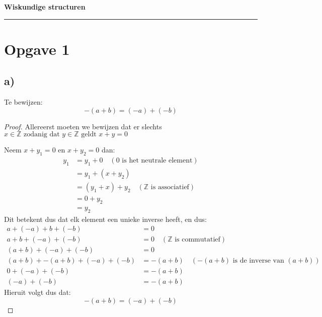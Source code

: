 \documentclass{article}
\newcommand{\Z}{\mathbb{Z}}
\newcommand{\tx}[1]{\text{#1}}
\newcommand{\zdd}{\text{ zodanig dat }}
\newcommand{\geldt}{\text{ geldt }}
\newcommand{\een}{\text{één }}
\newcommand{\en}{\text{ en }}
\begin{document}
\begin{center}
    \Large \textbf{Wiskundige structuren}
\end{center}

\rule{\textwidth}{2pt}

\bigskip

\section*{Opgave 1}
\subsection*{a)}
Te bewijzen:
\[-(a+b) = (-a) + (-b)\]
\begin{proof}
    Allereerst moeten we bewijzen dat er slechts \een $x \in \Z \zdd y \in \Z \geldt x + y = 0$

    Neem $x + y_1 = 0 \en x + y_2 = 0$ dan:
    \begin{align*}
        y_1 & = y_1 + 0 \quad (0 \tx{ is het neutrale element})  \\
            & = y_1 + (x + y_2)                                  \\
            & = (y_1 + x) + y_2 \quad ( \Z \tx{ is associatief}) \\
            & = 0 + y_2                                          \\
            & = y_2
    \end{align*}
    Dit betekent dus dat elk element een unieke inverse heeft, en dus:
    \begin{align*}
        a + (-a) + b + (-b)              & = 0                                                          \\
        a + b + (-a) + (-b)              & = 0 \quad (\Z \tx{ is commutatief})                          \\
        (a + b) + (-a) + (-b)            & = 0                                                          \\
        (a + b) + -(a + b) + (-a) + (-b) & = -(a + b) \quad (-(a + b) \tx{ is de inverse van } (a + b)) \\
        0 + (-a) + (-b)                  & = -(a + b)                                                   \\
        (-a) + (-b)                      & = -(a + b)
    \end{align*}
    Hieruit volgt dus dat:
    \[-(a+b) = (-a) + (-b)\]
\end{proof}
\end{document}
